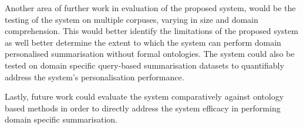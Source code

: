 Another area of further work in evaluation of the proposed system, would be the testing of the system on multiple corpuses, varying in size and domain comprehension. This would better identify the limitations of the proposed system as well better determine the extent to which the system can perform domain personalised summarisation without formal ontologies.  The system could also be tested on domain specific query-based summarisation datasets to quantifiably address the system’s personalisation performance. 

Lastly, future work could evaluate the system comparatively against ontology based methods in order to directly address the system efficacy in performing domain specific summarisation.
